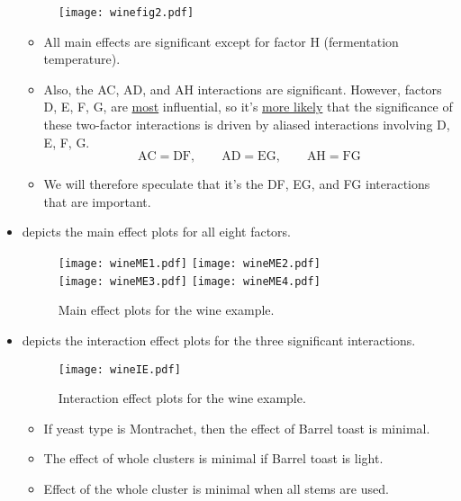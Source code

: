 \begin{itemize}
\begin{figure}[!htbp]
                  \texttt{[image: winefig2.pdf]}
            \end{figure}
            \begin{itemize}[*]
                  \item All main effects are significant except for factor H (fermentation temperature).
                  \item Also, the AC, AD, and AH interactions are significant. However, factors D, E, F, G, are \underline{most}
                        influential, so it's \underline{more likely} that the significance of these two-factor interactions is driven by aliased
                        interactions involving D, E, F, G.
                        \[ \text{AC}=\text{DF},\qquad\text{AD}=\text{EG},\qquad\text{AH}=\text{FG} \]
                  \item We will therefore speculate that it's the DF, EG, and FG interactions that are important.
            \end{itemize}
      \item {} depicts the main effect plots for all eight factors.
            \begin{figure}[!htbp]
                  \centering
                  \texttt{[image: wineME1.pdf]}\hfill
                  \texttt{[image: wineME2.pdf]}
                  \\[\smallskipamount]
                  \texttt{[image: wineME3.pdf]}\hfill
                  \texttt{[image: wineME4.pdf]}
                  \caption{Main effect plots for the wine example.}\label{fig:wineME}
            \end{figure}
      \item {} depicts the interaction effect plots for the three significant interactions.
            \begin{figure}[!htbp]
                  \centering
                  \texttt{[image: wineIE.pdf]}
                  \caption{Interaction effect plots for the wine example.}\label{fig:wineIE}
            \end{figure}
            \begin{itemize}
                  \item If yeast type is Montrachet, then the effect of Barrel toast is minimal.
                  \item The effect of whole clusters is minimal if Barrel toast is light.
                  \item Effect of the whole cluster is minimal when all stems are used.
            \end{itemize}
\end{itemize}
